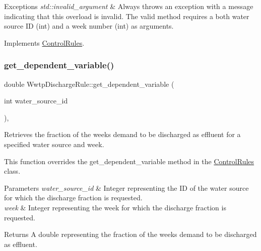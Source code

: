 \begin{DoxyExceptions}{Exceptions}
{\em std\+::invalid\+\_\+argument} & Always throws an exception with a message indicating that this overload is invalid. The valid method requires a both water source ID (int) and a week number (int) as arguments. \\
\hline
\end{DoxyExceptions}


Implements \mbox{\hyperlink{classControlRules}{Control\+Rules}}.

\mbox{\label{classWwtpDischargeRule_a3338c0fc43d656a6730ca72dd5d3e51e}} 
\subsubsection{\texorpdfstring{get\+\_\+dependent\+\_\+variable()}{get\_dependent\_variable()}\hspace{0.1cm}{\footnotesize\ttfamily [2/4]}}
{\footnotesize\ttfamily double Wwtp\+Discharge\+Rule\+::get\+\_\+dependent\+\_\+variable (\begin{DoxyParamCaption}\item[{int}]{water\+\_\+source\+\_\+id }\end{DoxyParamCaption})\hspace{0.3cm}{\ttfamily [override]}, {\ttfamily [virtual]}}



Retrieves the fraction of the week\textquotesingle{}s demand to be discharged as effluent for a specified water source and week. 

This function overrides the {\ttfamily get\+\_\+dependent\+\_\+variable} method in the {\ttfamily \mbox{\hyperlink{classControlRules}{Control\+Rules}}} class.


\begin{DoxyParams}{Parameters}
{\em water\+\_\+source\+\_\+id} & Integer representing the ID of the water source for which the discharge fraction is requested. \\
\hline
{\em week} & Integer representing the week for which the discharge fraction is requested.\\
\hline
\end{DoxyParams}
\begin{DoxyReturn}{Returns}
A double representing the fraction of the week\textquotesingle{}s demand to be discharged as effluent. 
\end{DoxyReturn}


